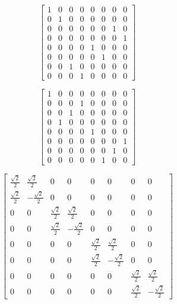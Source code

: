 \documentclass{article}
\begin{document}
\vspace{5mm}

\[\displaystyle \begin{bmatrix}1 & 0 & 0 & 0 & 0 & 0 & 0 & 0\\0 & 1 & 0 & 0 & 0 & 0 & 0 & 0\\0 & 0 & 0 & 0 & 0 & 0 & 1 & 0\\0 & 0 & 0 & 0 & 0 & 0 & 0 & 1\\0 & 0 & 0 & 0 & 1 & 0 & 0 & 0\\0 & 0 & 0 & 0 & 0 & 1 & 0 & 0\\0 & 0 & 1 & 0 & 0 & 0 & 0 & 0\\0 & 0 & 0 & 1 & 0 & 0 & 0 & 0\end{bmatrix}\]

\vspace{5mm}

\[\displaystyle \begin{bmatrix}1 & 0 & 0 & 0 & 0 & 0 & 0 & 0\\0 & 0 & 0 & 1 & 0 & 0 & 0 & 0\\0 & 0 & 1 & 0 & 0 & 0 & 0 & 0\\0 & 1 & 0 & 0 & 0 & 0 & 0 & 0\\0 & 0 & 0 & 0 & 1 & 0 & 0 & 0\\0 & 0 & 0 & 0 & 0 & 0 & 0 & 1\\0 & 0 & 0 & 0 & 0 & 0 & 1 & 0\\0 & 0 & 0 & 0 & 0 & 1 & 0 & 0\end{bmatrix}\]

\vspace{5mm}

\[\displaystyle \begin{bmatrix}\frac{\sqrt{2}}{2} & \frac{\sqrt{2}}{2} & 0 & 0 & 0 & 0 & 0 & 0\\\frac{\sqrt{2}}{2} & - \frac{\sqrt{2}}{2} & 0 & 0 & 0 & 0 & 0 & 0\\0 & 0 & \frac{\sqrt{2}}{2} & \frac{\sqrt{2}}{2} & 0 & 0 & 0 & 0\\0 & 0 & \frac{\sqrt{2}}{2} & - \frac{\sqrt{2}}{2} & 0 & 0 & 0 & 0\\0 & 0 & 0 & 0 & \frac{\sqrt{2}}{2} & \frac{\sqrt{2}}{2} & 0 & 0\\0 & 0 & 0 & 0 & \frac{\sqrt{2}}{2} & - \frac{\sqrt{2}}{2} & 0 & 0\\0 & 0 & 0 & 0 & 0 & 0 & \frac{\sqrt{2}}{2} & \frac{\sqrt{2}}{2}\\0 & 0 & 0 & 0 & 0 & 0 & \frac{\sqrt{2}}{2} & - \frac{\sqrt{2}}{2}\end{bmatrix}\]
\end{document}
